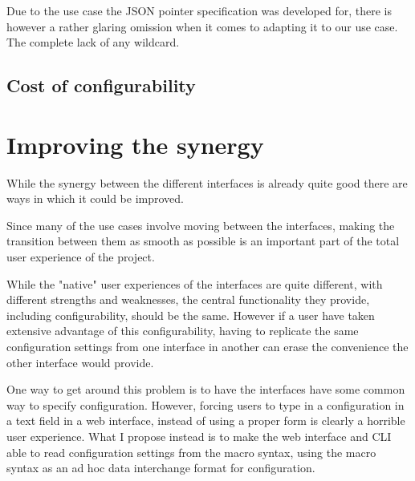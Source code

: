 Due to the use case the JSON pointer specification was developed for, there is however a rather glaring omission when it comes to adapting it to our use case. The complete lack of any wildcard.



\subsection{Cost of configurability}



\section{Improving the synergy}

While the synergy between the different interfaces is already quite good there are ways in which it could be improved.

Since many of the use cases involve moving between the interfaces, making the transition between them as smooth as possible is an important part of the total user experience of the project.

While the "native" user experiences of the interfaces are quite different, with different strengths and weaknesses, the central functionality they provide, including configurability, should be the same. However if a user have taken extensive advantage of this configurability, having to replicate the same configuration settings from one interface in another can erase the convenience the other interface would provide.

One way to get around this problem is to have the interfaces have some common way to specify configuration. However, forcing users to type in a configuration in a text field in a web interface, instead of using a proper form is clearly a horrible user experience. What I propose instead is to make the web interface and CLI able to read configuration settings from the macro syntax, using the macro syntax as an ad hoc data interchange format for configuration.



